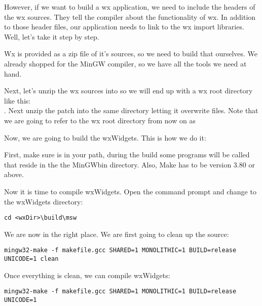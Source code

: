 However, if we want to build a wx application, we need to include the headers of the wx sources. They tell the compiler about the functionality of wx. In addition to those header files, our application needs to link to the wx import libraries. Well, let's take it step by step.

Wx is provided as a zip file of it's sources, so we need to build that ourselves. We already shopped for the MinGW compiler, so we have all the tools we need at hand.

Next, let's unzip the wx sources into  so we will end up with a wx root directory like this:\\
. Next unzip the patch into the same directory letting it overwrite files. Note that we are going to refer to the wx root directory from now on as 


Now, we are going to build the wxWidgets. This is how we do it:

First, make sure  is in your path, during the build some programs will be called that reside in the the MinGW\osp bin directory. Also, Make has to be version 3.80 or above.

Now it is time to compile wxWidgets. Open the command prompt and change to the wxWidgets directory:

\begin{verbatim}
cd <wxDir>\build\msw
\end{verbatim}

We are now in the right place. We are first going to clean up the source:

\begin{verbatim}
mingw32-make -f makefile.gcc SHARED=1 MONOLITHIC=1 BUILD=release UNICODE=1 clean
\end{verbatim}

Once everything is clean, we can compile wxWidgets:

\begin{verbatim}
mingw32-make -f makefile.gcc SHARED=1 MONOLITHIC=1 BUILD=release UNICODE=1
\end{verbatim}

